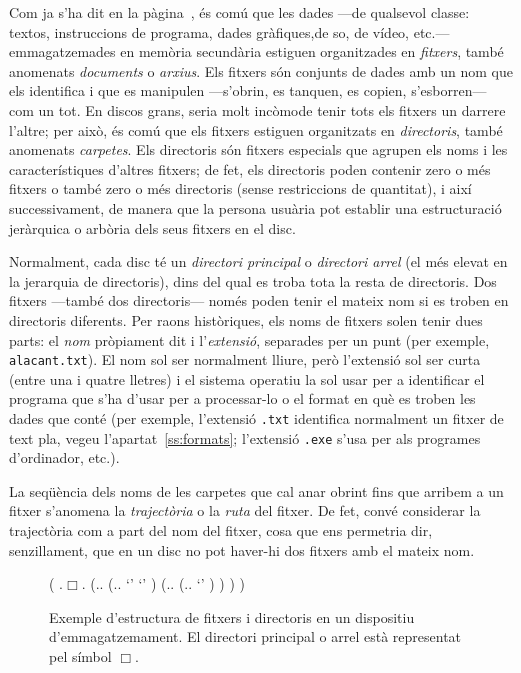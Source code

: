 Com ja s'ha dit en la pàgina~\pageref{pg:menciofitxer}, és comú que
les dades ---de qualsevol classe: textos, instruccions de programa,
dades gràfiques,de so, de vídeo, etc.--- emmagatzemades en memòria
secundària estiguen organitzades en {\em fitxers}, també anomenats
\emph{documents} o \emph{arxius}. Els fitxers són conjunts de dades
amb un nom que els identifica i que es manipulen ---s'obrin, es
tanquen, es copien, s'esborren--- com un tot. En discos grans, seria
molt incòmode tenir tots els fitxers un darrere l'altre; per això, és
comú que els fitxers estiguen organitzats en {\em directoris}, també
anomenats \emph{carpetes}. Els directoris són fitxers especials que
agrupen els noms i les característiques d'altres fitxers; de fet, els
directoris poden contenir zero o més fitxers o també zero o més
directoris (sense restriccions de quantitat), i així successivament,
de manera que la persona usuària pot establir una estructuració
jeràrquica o arbòria dels seus fitxers en el disc.

Normalment, cada disc té un {\em directori principal} o
\emph{directori arrel} (el més elevat en la jerarquia de directoris),
dins del qual es troba tota la resta de directoris. Dos fitxers
---també dos directoris--- només poden tenir el mateix nom si es
troben en directoris diferents. Per raons històriques, els noms de
fitxers solen tenir dues parts: el \emph{nom} pròpiament dit i
l'\emph{extensió}, separades per un punt (per exemple,
\texttt{alacant.txt}). El nom sol ser normalment lliure, però
l'extensió sol ser curta (entre una i quatre lletres) i el sistema
operatiu la sol usar per a identificar el programa que s'ha d'usar per
a processar-lo o el format en què es troben les dades que conté (per
exemple, l'extensió \texttt{.txt} identifica normalment un fitxer de
text pla, vegeu l'apartat~\ref{ss:formats}; l'extensió \texttt{.exe}
s'usa per als programes d'ordinador, etc.).


La seqüència dels noms de les carpetes que cal anar obrint fins que
arribem a un fitxer s'anomena la \emph{trajectòria} o la \emph{ruta}
del fitxer.  De fet, convé considerar la trajectòria com a part del
nom del fitxer, cosa que ens permetria dir, senzillament, que en un
disc no pot haver-hi dos fitxers amb el mateix nom.  

\begin{figure}
\centering
\begin{parsetree}
    ( .{$\Box$}.
      (.{}.
         (.{}.
               `'
               `'
      )
         (.{}.
         (.{}.
              `'
         )
         )
      )
    )
\end{parsetree}
\caption{Exemple d'estructura de fitxers i directoris en un dispositiu
  d'emmagatzemament. El directori principal o arrel està
  representat pel símbol $\Box$.}\label{fg:fitxersdirs}
\end{figure}

